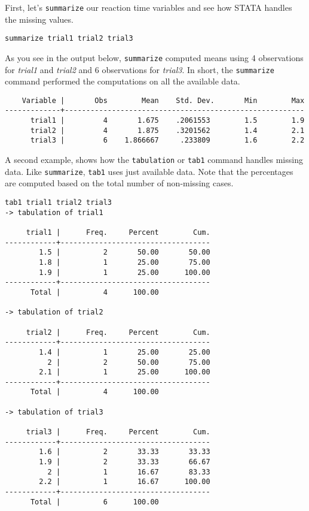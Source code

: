First, let's \lstinline{summarize} our reaction time variables and see how STATA handles the missing values.

\begin{lstlisting}
summarize trial1 trial2 trial3
\end{lstlisting}

As you see in the output below, \lstinline{summarize} computed means using 4 observations for \textit{trial1} and \textit{trial2} and 6 observations for \textit{trial3}. In short, the \lstinline{summarize} command performed the computations on all the available data.

\begin{lstlisting}
    Variable |       Obs        Mean    Std. Dev.       Min        Max
-------------+--------------------------------------------------------
      trial1 |         4       1.675    .2061553        1.5        1.9
      trial2 |         4       1.875    .3201562        1.4        2.1
      trial3 |         6    1.866667     .233809        1.6        2.2
\end{lstlisting}

A second example, shows how the \lstinline{tabulation} or \lstinline{tab1} command handles missing data. Like \lstinline{summarize}, \lstinline{tab1} uses just available data. Note that the percentages are computed based on the total number of non-missing cases.

\begin{lstlisting}
tab1 trial1 trial2 trial3
-> tabulation of trial1

     trial1 |      Freq.     Percent        Cum.
------------+-----------------------------------
        1.5 |          2       50.00       50.00
        1.8 |          1       25.00       75.00
        1.9 |          1       25.00      100.00
------------+-----------------------------------
      Total |          4      100.00

-> tabulation of trial2

     trial2 |      Freq.     Percent        Cum.
------------+-----------------------------------
        1.4 |          1       25.00       25.00
          2 |          2       50.00       75.00
        2.1 |          1       25.00      100.00
------------+-----------------------------------
      Total |          4      100.00

-> tabulation of trial3

     trial3 |      Freq.     Percent        Cum.
------------+-----------------------------------
        1.6 |          2       33.33       33.33
        1.9 |          2       33.33       66.67
          2 |          1       16.67       83.33
        2.2 |          1       16.67      100.00
------------+-----------------------------------
      Total |          6      100.00
\end{lstlisting}

